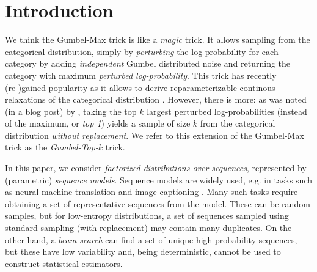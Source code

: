 \begin{abstract}
The well-known Gumbel-Max trick for sampling from a categorical distribution can be extended to sample $k$ elements without replacement. We show how to implicitly apply this `\emph{Gumbel-Top-$k$}' trick on a factorized distribution over sequences, allowing to draw exact samples without replacement using a \emph{Stochastic Beam Search}. Even for exponentially large domains, the number of model evaluations grows only linear in $k$ and the maximum sampled sequence length. The algorithm creates a theoretical connection between sampling and (deterministic) beam search and can be used as a principled intermediate alternative. In a translation task, the proposed method compares favourably against alternatives to obtain diverse yet good quality translations. We show that sequences sampled without replacement can be used to construct low-variance estimators for expected sentence-level BLEU score and model entropy.
\end{abstract}

\section{Introduction}
We think the Gumbel-Max trick \cite{gumbel1954statistical,maddison2014sampling} is like a \emph{magic} trick. It allows sampling from the categorical distribution, simply by \emph{perturbing} the log-probability for each category by adding \emph{independent} Gumbel distributed noise and returning the category with maximum \emph{perturbed log-probability}. This trick has recently (re-)gained popularity as it allows to derive reparameterizable continous relaxations of the categorical distribution \citep{maddison2016concrete,jang2016categorical}. However, there is more: as was noted (in a blog post) by \citet{vieira2014gumbel}, taking the top $k$ largest perturbed log-probabilities (instead of the maximum, or \emph{top 1}) yields a sample of size $k$ from the categorical distribution \emph{without replacement}. We refer to this extension of the Gumbel-Max trick as the \emph{Gumbel-Top-$k$} trick.

In this paper, we consider \emph{factorized distributions over sequences}, represented by (parametric) \emph{sequence models}. Sequence models are widely used, e.g. in tasks such as neural machine translation \citep{sutskever2014sequence, bahdanau2014neural} and image captioning \citep{vinyals2015show}. Many such tasks require obtaining a set of representative sequences from the model. These can be random samples, but for low-entropy distributions, a set of sequences sampled using standard sampling (with replacement) may contain many duplicates. On the other hand, a \emph{beam search} can find a set of unique high-probability sequences, but these have low variability and, being deterministic, cannot be used to construct statistical estimators.

